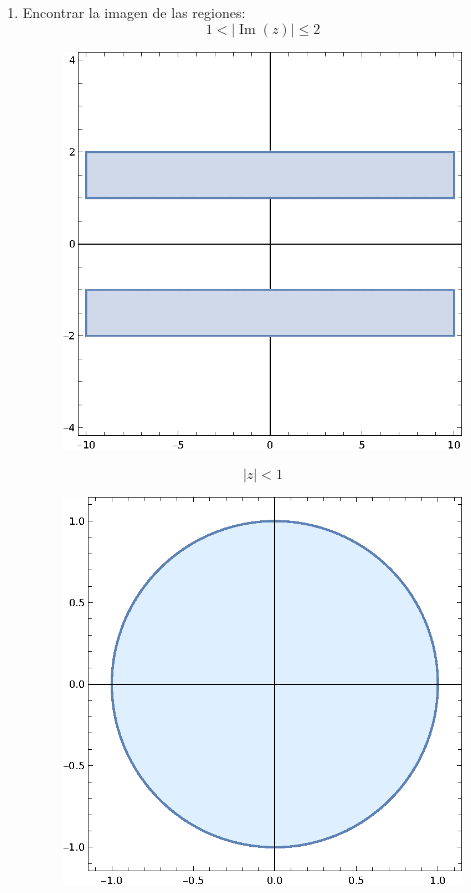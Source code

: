\documentclass[11pt]{article}
\begin{document}
\begin{enumerate}
    \item Encontrar la imagen de las regiones:
    \[1 < | \operatorname{Im}(z) | \leq 2\]

    \begin{figure}[H]
    \centering
    \includegraphics[scale=0.8]{Graphics/P3-1.eps}
    \end{figure}

    \[|z| < 1\]

    \begin{figure}[H]
    \centering
    \includegraphics[scale=0.8]{Graphics/P3-2.eps}
    \end{figure}


\end{enumerate}
\end{document}
